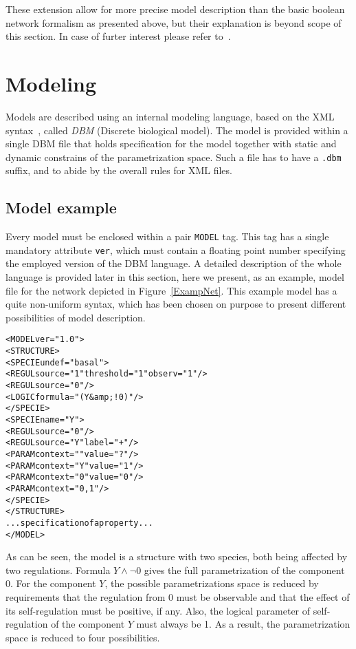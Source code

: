 \documentclass[12pt]{article}
\begin{document}
These extension allow for more precise model description than the basic boolean network formalism as presented above, but their explanation is beyond scope of this section. In case of furter interest please refer to~\cite{TechReport}.

\section{Modeling}
\label{sec:modeling}
 Models are described using an internal modeling language, based on the XML syntax~\cite{XML}, called \emph{DBM} (Discrete biological model). The model is provided within a single DBM file that holds specification for the model together with static and dynamic constrains of the parametrization space. Such a file has to have a \texttt{.dbm} suffix, and to abide by the overall rules for XML files.

\subsection{Model example}
Every model must be enclosed within a pair \texttt{MODEL} tag. This tag has a single mandatory attribute \texttt{ver}, which must contain a floating point number specifying the employed version of the DBM language. A detailed description of the whole language is provided later in this section, here we present, as an example, model file for the network depicted in Figure~\ref{ExampNet}. This example model has a quite non-uniform syntax, which has been chosen on purpose to present different possibilities of model description.
\begin{alltt}
<MODEL ver="1.0">
    <STRUCTURE>
        <SPECIE undef="basal">
            <REGUL source="1" threshold ="1" observ="1" />
            <REGUL source="0" />            
            <LOGIC formula="(Y &amp; !0)" />
        </SPECIE>
        <SPECIE name="Y">
            <REGUL source="0" />
            <REGUL source="Y" label="+" />            
            <PARAM context="" value="?" />
            <PARAM context="Y" value="1" />
            <PARAM context="0" value="0" />
            <PARAM context="0,1" />            
        </SPECIE>
    </STRUCTURE>
    ... specification of a property ...
</MODEL>
\end{alltt}
As can be seen, the model is a structure with two species, both being affected by two regulations. Formula $Y \wedge \neg 0$ gives the full parametrization of the component $0$. For the component $Y$, the possible parametrizations space is reduced by requirements that the regulation from $0$ must be observable and that the effect of its self-regulation must be positive, if any. Also, the logical parameter of self-regulation of the component $Y$ must always be 1. As a result, the parametrization space is reduced to four possibilities.
\end{document}
